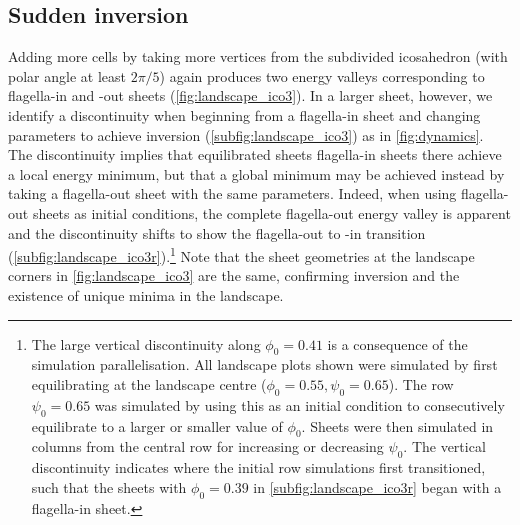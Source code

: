 \subsection{Sudden inversion}

Adding more cells by taking more vertices from the subdivided icosahedron (with polar angle at least $2\pi/5$) again produces two energy valleys corresponding to flagella-in and -out sheets (\cref{fig:landscape_ico3}). 
In a larger sheet, however, we identify a discontinuity when beginning from a flagella-in sheet and changing parameters to achieve inversion (\cref{subfig:landscape_ico3}) as in \cref{fig:dynamics}.
The discontinuity implies that equilibrated sheets flagella-in sheets there achieve a local energy minimum, but that a global minimum may be achieved instead by taking a flagella-out sheet with the same parameters. 
Indeed, when using flagella-out sheets as initial conditions, the complete flagella-out energy valley is apparent and the discontinuity shifts to show the flagella-out to -in transition (\cref{subfig:landscape_ico3r}).\footnote{The large vertical discontinuity along $\phi_0=0.41$ is a consequence of the simulation parallelisation. All landscape plots shown were simulated by first equilibrating at the landscape centre ($\phi_0=0.55,\psi_0=0.65$). The row $\psi_0=0.65$ was simulated by using this as an initial condition to consecutively equilibrate to a larger or smaller value of $\phi_0$. Sheets were then simulated in columns from the central row for increasing or decreasing $\psi_0$. The vertical discontinuity indicates where the initial row simulations first transitioned, such that the sheets with $\phi_0=0.39$ in \cref{subfig:landscape_ico3r} began with a flagella-in sheet.}
Note that the sheet geometries at the landscape corners in \cref{fig:landscape_ico3} are the same, confirming inversion and the existence of unique minima in the landscape.

